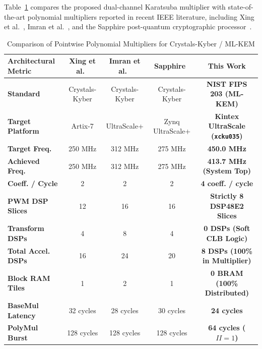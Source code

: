 Table~\ref{tab:prior_art_comparison_pwm} compares the proposed dual-channel Karatsuba multiplier with state-of-the-art polynomial multipliers reported in recent IEEE literature, including Xing et al.~\cite{xing2023tcas1}, Imran et al.~\cite{imran2022tvlsi}, and the Sapphire post-quantum cryptographic processor~\cite{banerjee2021sapphire}.

\begin{table}[!t]
\caption{Comparison of Pointwise Polynomial Multipliers for Crystals-Kyber / \mbox{ML-KEM}}
\label{tab:prior_art_comparison_pwm}
\centering
\footnotesize
\begin{tabular*}{\textwidth}{@{\extracolsep{\fill}} lcccc @{}}
\toprule
\textbf{Architectural Metric} & \textbf{Xing et al.}~\cite{xing2023tcas1} & \textbf{Imran et al.}~\cite{imran2022tvlsi} & \textbf{Sapphire}~\cite{banerjee2021sapphire} & \textbf{This Work} \\
\midrule
\textbf{Standard} & Crystals-Kyber & Crystals-Kyber & Crystals-Kyber & \textbf{NIST FIPS 203 (ML-KEM)} \\
\textbf{Target Platform}        & Artix-7        & UltraScale+    & Zynq UltraScale+ & \textbf{Kintex UltraScale (\texttt{xcku035})} \\
\textbf{Target Freq.} & 250 MHz        & 312 MHz        & 275 MHz        & \textbf{450.0 MHz} \\
\textbf{Achieved Freq.}     & 250 MHz        & 312 MHz        & 275 MHz        & \textbf{413.7 MHz (System Top)} \\
\textbf{Coeff. / Cycle}   & 2              & 2              & 2              & \textbf{4 coeff. / cycle} \\
\textbf{PWM DSP Slices}   & 12             & 16             & 16             & \textbf{Strictly 8 DSP48E2 Slices} \\
\textbf{Transform DSPs}    & 4              & 8              & 4              & \textbf{0 DSPs (Soft CLB Logic)} \\
\textbf{Total Accel. DSPs} & 16             & 24             & 20             & \textbf{8 DSPs (100\% in Multiplier)} \\
\textbf{Block RAM Tiles}  & 1              & 2              & 1              & \textbf{0 BRAM (100\% Distributed)} \\
\textbf{BaseMul Latency}        & 32 cycles      & 28 cycles      & 30 cycles      & \textbf{24 cycles} \\
\textbf{PolyMul Burst}   & 128 cycles     & 128 cycles     & 128 cycles     & \textbf{64 cycles ($II = 1$)} \\
\bottomrule
\end{tabular*}
\end{table}

